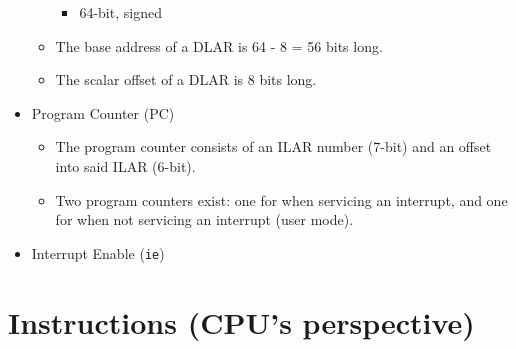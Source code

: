 \documentclass{article}
\begin{document}
\begin{itemize}
\begin{itemize}
\begin{itemize}
			\item 64-bit, signed
			\end{itemize}
		\item The base address of a DLAR is 64 - 8 = 56 bits long.
		\item The scalar offset of a DLAR is 8 bits long.
		\end{itemize}
	\item Program Counter (PC)
		\begin{itemize}
		\item The program counter consists of an ILAR number (7-bit) and an
			offset into said ILAR (6-bit).
		\item Two program counters exist:  one for when servicing an
			interrupt, and one for when not servicing an interrupt (user
			mode).
		\end{itemize}
	\item Interrupt Enable (\texttt{ie})
	\end{itemize}

\section{Instructions (CPU's perspective)}
\end{document}
